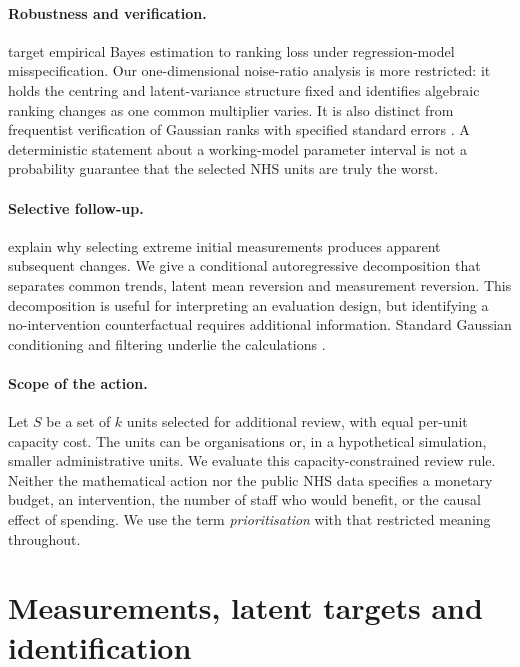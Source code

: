 \documentclass[11pt,letterpaper]{article}
\begin{document}
\paragraph{Robustness and verification.}
\citet{henderson2025robust} target empirical Bayes estimation to ranking loss under regression-model misspecification. Our one-dimensional noise-ratio analysis is more restricted: it holds the centring and latent-variance structure fixed and identifies algebraic ranking changes as one common multiplier varies. It is also distinct from frequentist verification of Gaussian ranks with specified standard errors \citep{goldwasser2025verification}. A deterministic statement about a working-model parameter interval is not a probability guarantee that the selected NHS units are truly the worst.

\paragraph{Selective follow-up.}
\citet{barnett2005rtm} explain why selecting extreme initial measurements produces apparent subsequent changes. We give a conditional autoregressive decomposition that separates common trends, latent mean reversion and measurement reversion. This decomposition is useful for interpreting an evaluation design, but identifying a no-intervention counterfactual requires additional information. Standard Gaussian conditioning and filtering underlie the calculations \citep{kalman1960filter}.

\paragraph{Scope of the action.}
Let $S$ be a set of $k$ units selected for additional review, with equal per-unit capacity cost. The units can be organisations or, in a hypothetical simulation, smaller administrative units. We evaluate this capacity-constrained review rule. Neither the mathematical action nor the public NHS data specifies a monetary budget, an intervention, the number of staff who would benefit, or the causal effect of spending. We use the term \emph{prioritisation} with that restricted meaning throughout.

\section{Measurements, latent targets and identification}
\end{document}
